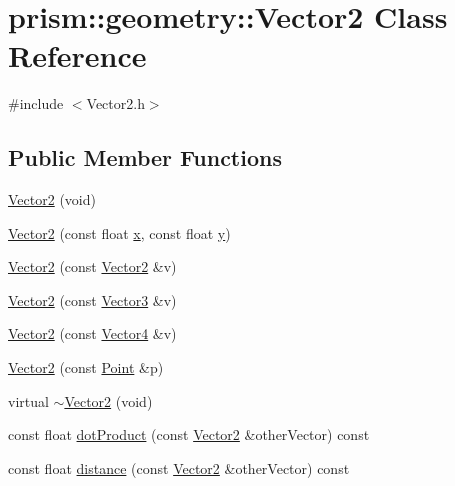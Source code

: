 \hypertarget{classprism_1_1geometry_1_1_vector2}{}\section{prism\+:\+:geometry\+:\+:Vector2 Class Reference}
\label{classprism_1_1geometry_1_1_vector2}


{\ttfamily \#include $<$Vector2.\+h$>$}

\subsection*{Public Member Functions}
\begin{DoxyCompactItemize}
\item 
\hyperlink{classprism_1_1geometry_1_1_vector2_aa5d980ef1917d61bd2b94ebde33eb4bc}{Vector2} (void)
\item 
\hyperlink{classprism_1_1geometry_1_1_vector2_a3caaceaf7dbec8dad438240ac1aa264b}{Vector2} (const float \hyperlink{classprism_1_1geometry_1_1_vector2_a70e4ecc1edbd65a2a436da4ebb363bec}{x}, const float \hyperlink{classprism_1_1geometry_1_1_vector2_a30579e6692e8074cf951ce37fef7f01a}{y})
\item 
\hyperlink{classprism_1_1geometry_1_1_vector2_ad79074fd4a43bc8a15edd867dbf2dfc1}{Vector2} (const \hyperlink{classprism_1_1geometry_1_1_vector2}{Vector2} \&v)
\item 
\hyperlink{classprism_1_1geometry_1_1_vector2_a4f7c72b3cc4ec808cbad8017721516d3}{Vector2} (const \hyperlink{classprism_1_1geometry_1_1_vector3}{Vector3} \&v)
\item 
\hyperlink{classprism_1_1geometry_1_1_vector2_a3a3b47d1addcc4b92ad4c4f6b4c3fca1}{Vector2} (const \hyperlink{classprism_1_1geometry_1_1_vector4}{Vector4} \&v)
\item 
\hyperlink{classprism_1_1geometry_1_1_vector2_a94131fbec0f0a42478c3489a8be57093}{Vector2} (const \hyperlink{classprism_1_1geometry_1_1_point}{Point} \&p)
\item 
virtual \hyperlink{classprism_1_1geometry_1_1_vector2_ab8bd01e24bdbb8aec757ea92ae6b8577}{$\sim$\+Vector2} (void)
\item 
const float \hyperlink{classprism_1_1geometry_1_1_vector2_a1d36a5e192af9cbbe4e2395e6d4e16f8}{dot\+Product} (const \hyperlink{classprism_1_1geometry_1_1_vector2}{Vector2} \&other\+Vector) const 
\item 
const float \hyperlink{classprism_1_1geometry_1_1_vector2_ad37a0cef216b389d6d21e6d1e61b2d0a}{distance} (const \hyperlink{classprism_1_1geometry_1_1_vector2}{Vector2} \&other\+Vector) const 

\end{DoxyCompactItemize}
